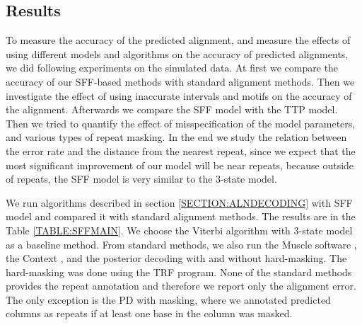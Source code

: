 \subsection{Results}\label{SECTION:REPSIMRESULTS}
To measure the accuracy of the predicted alignment, and measure the effects of
using different models and algorithms on the accuracy of predicted alignments,
we did following experiments on the simulated data. At first we compare the
accuracy of our SFF-based methods with standard alignment methods. Then we
investigate the effect of using inaccurate intervals and motifs on the accuracy
of the alignment. Afterwards we compare the SFF model with the TTP model. Then
we tried to quantify the effect of misspecification of the model parameters,
and various types of repeat masking. In the end we study the relation between
the error rate and the distance from the nearest repeat, since we expect that
the most significant improvement of our model will be near repeats, because
outside of repeats, the SFF model is very similar to the 3-state model.

We run algorithms described in section \ref{SECTION:ALNDECODING} with SFF model
and compared it with standard alignment methods. The results are in the Table
\ref{TABLE:SFFMAIN}. We choose the Viterbi algorithm with 3-state model as a
baseline method. From standard methods, we also run the Muscle software
\cite{Edgar2004}, the Context \cite{Hickey2011}, and the posterior decoding
with and without hard-masking.  The hard-masking was done using the TRF
program. None of the standard methods provides the repeat annotation and
therefore we report only the alignment error. The only exception is the PD with
masking, where we annotated predicted columns as repeats if at least one base
in the column was masked.

\def\M{$^\circ$} %
\def\MM{$^{\circ\circ\circ}$} %
\def\D{$^{\circ\circ}$} %
\def\DD{$^{\dagger}$} %
\def\R{$^{\yen}$}
\def\RR{$^{\yen\yen}$}
\def\CC#1{\multicolumn{1}{c}{#1}} %
\def\S{$^{\star}$}


